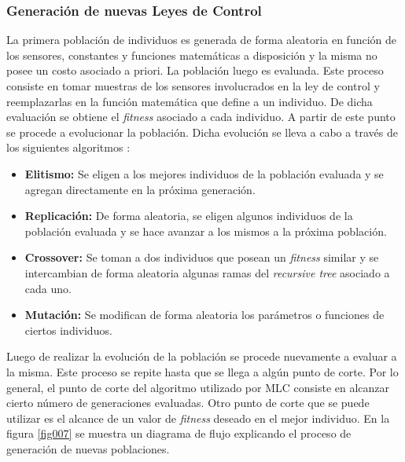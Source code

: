 \documentclass[a4paper,10pt]{article}
\begin{document}
    \subsubsection{Generación de nuevas Leyes de Control} \label{sec:law_gen}
        \indent La primera población de individuos es generada de forma aleatoria en función de los sensores, constantes y funciones
        matemáticas a disposición y la misma no posee un costo asociado a priori. La población luego es evaluada. Este proceso consiste en 
        tomar muestras de los sensores involucrados en la ley de control y reemplazarlas en la función matemática que define a un 
        individuo. De dicha evaluación se obtiene el \textit{fitness} asociado a cada individuo. A partir de
        este punto se procede a evolucionar la población. Dicha evolución se lleva a cabo a través de los siguientes algoritmos
        \cite{Duriez2016}:

        \begin{itemize}
            \item \textbf{Elitismo:} Se eligen a los mejores individuos de la población evaluada y se agregan directamente en la próxima
            generación.
            \item \textbf{Replicación:} De forma aleatoria, se eligen algunos individuos de la población evaluada y se hace avanzar a los
            mismos a la próxima población.
        \item \textbf{Crossover:} Se toman a dos individuos que posean un \textit{fitness} similar y se intercambian de forma aleatoria
            algunas ramas del \textit{recursive tree} asociado a cada uno.
            \item \textbf{Mutación:} Se modifican de forma aleatoria los parámetros o funciones de ciertos individuos.
        \end{itemize}

        Luego de realizar la evolución de la población se procede nuevamente a evaluar a la misma. Este proceso
        se repite hasta que se llega a algún punto de corte. Por lo general, el punto de corte del algoritmo utilizado por MLC consiste en
        alcanzar cierto número de generaciones evaluadas. Otro punto de corte que se puede utilizar es el alcance de un valor de 
        \textit{fitness} deseado en el mejor individuo. En la figura \ref{fig007} se muestra un diagrama de flujo
        explicando el proceso de generación de nuevas poblaciones.
\end{document}

